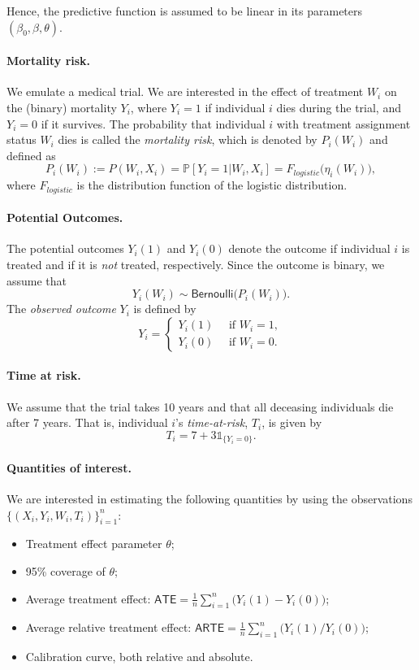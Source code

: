 \documentclass[11pt]{article}
\renewcommand{\P}{\mathbb{P}}
\newcommand{\indic}{\mathds{1}}
\begin{document}
Hence, the predictive function is assumed to be linear in its parameters $(\beta_0, \beta, \theta)$.

\paragraph{Mortality risk.} We emulate a medical trial. We are interested in the effect of treatment $W_i$ on the (binary) mortality $Y_i$, where $Y_i=1$ if individual $i$ dies during the trial, and $Y_i=0$ if it survives. The probability that individual $i$ with treatment assignment status $W_i$ dies is called the \textit{mortality risk}, which is denoted by $P_i(W_i)$ and defined as
\[
P_i(W_i) := P(W_i, X_i) = \P [Y_i=1 | W_i, X_i]
= F_{logistic}\Big( \eta_i(W_i) \Big),
\]
where $F_{logistic}$ is the distribution function of the logistic distribution.

\paragraph{Potential Outcomes.} 
The potential outcomes $Y_i(1)$ and $Y_i(0)$ denote the outcome if individual $i$ is treated and if it is \textit{not} treated, respectively. Since the outcome is binary, we assume that
\[
    Y_i(W_i) \sim \textsf{Bernoulli} \Big( P_i(W_i) \Big). 
\]
The \textit{observed outcome} $Y_i$ is defined by
\[
    Y_i = 
    \begin{cases}
    Y_i(1) \quad \text{ if } W_i =1, \\
    Y_i(0) \quad \text{ if } W_i =0.
    \end{cases}
\]

\paragraph{Time at risk.} We assume that the trial takes 10 years and that all deceasing individuals die after 7 years. That is, individual $i$'s \textit{time-at-risk}, $T_i$, is given by
\[
    T_i = 7 + 3\indic_{\{ Y_i = 0\}}.
\]

\paragraph{Quantities of interest.}
We are interested in estimating the following quantities by using the observations $\{(X_i, Y_i, W_i, T_i)\}_{i=1}^n$:
\begin{itemize}
    \item Treatment effect parameter $\theta$;
    \item 95\% coverage of $\theta$;
    \item Average treatment effect: $\textsf{ATE} = \frac{1}{n} \sum_{i=1}^n \big(Y_i(1) - Y_i(0)\big)$;
    \item Average relative treatment effect: $\textsf{ARTE} = \frac{1}{n} \sum_{i=1}^n \big( Y_i(1) \big/ Y_i(0) \big)$;
    \item Calibration curve, both relative and absolute.
\end{itemize}
\end{document}
